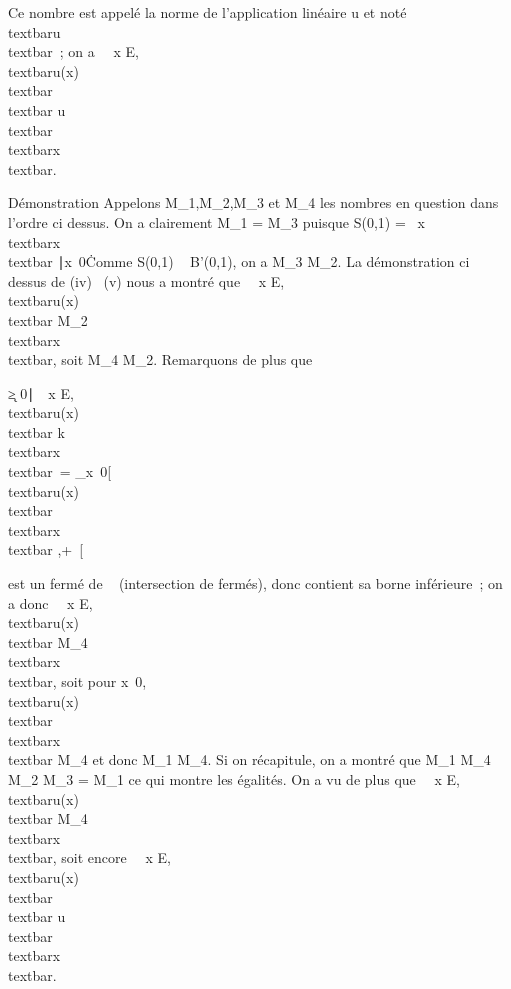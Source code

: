\documentclass[]{article}
\begin{document}
Ce nombre est appelé la norme de l'application linéaire u et noté
\\textbar{}u\\textbar{}~; on a
\forall~~x \in E,
\\textbar{}u(x)\\textbar{}
\leq\\textbar{}
u\\textbar{}\,\\textbar{}x\\textbar{}.

Démonstration Appelons M\_1,M\_2,M\_3 et
M\_4 les nombres en question dans l'ordre ci dessus. On a
clairement M\_1 = M\_3 puisque S(0,1) =
\ x \over
\\textbar{}x\\textbar{}
∣x\mathrel\neq~0\.
Comme S(0,1) \subset~ B'(0,1), on a M\_3 \leq M\_2. La
démonstration ci dessus de (iv) \rigtharrow~(v) nous a montré que
\forall~~x \in E,
\\textbar{}u(x)\\textbar{} \leq
M\_2\\textbar{}x\\textbar{}, soit
M\_4 \leq M\_2. Remarquons de plus que

\k ≥
0∣\forall~~x \in E,
\\textbar{}u(x)\\textbar{} \leq
k\\textbar{}x\\textbar{}\
= \⋂
\_x\neq~0{[}
\\textbar{}u(x)\\textbar{}
\over
\\textbar{}x\\textbar{} ,+\infty~{[}

est un fermé de ~ (intersection de fermés), donc contient sa borne
inférieure~; on a donc \forall~~x \in E,
\\textbar{}u(x)\\textbar{} \leq
M\_4\\textbar{}x\\textbar{}, soit
pour x\neq~0, 
\\textbar{}u(x)\\textbar{}
\over
\\textbar{}x\\textbar{} \leq M\_4
et donc M\_1 \leq M\_4. Si on récapitule, on a montré que
M\_1 \leq M\_4 \leq M\_2 \leq M\_3 = M\_1
ce qui montre les égalités. On a vu de plus que
\forall~~x \in E,
\\textbar{}u(x)\\textbar{} \leq
M\_4\\textbar{}x\\textbar{}, soit
encore \forall~~x \in E,
\\textbar{}u(x)\\textbar{}
\leq\\textbar{}
u\\textbar{}\,\\textbar{}x\\textbar{}.
\end{document}
